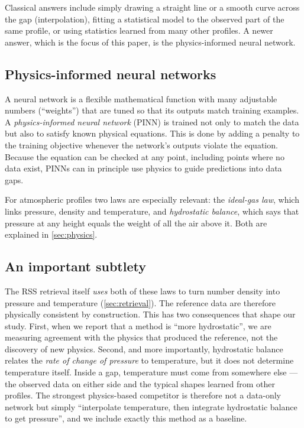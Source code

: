 \documentclass[11pt,a4paper]{article}
\begin{document}
Classical answers include simply drawing a straight line or a smooth curve across the gap (interpolation), fitting a statistical model to the observed part of the same profile, or using statistics learned from many other profiles. A newer answer, which is the focus of this paper, is the physics-informed neural network.

\subsection{Physics-informed neural networks}
A neural network is a flexible mathematical function with many adjustable numbers (``weights'') that are tuned so that its outputs match training examples. A \emph{physics-informed neural network} (PINN) \citep{raissi2019,karniadakis2021} is trained not only to match the data but also to satisfy known physical equations. This is done by adding a penalty to the training objective whenever the network's outputs violate the equation. Because the equation can be checked at any point, including points where no data exist, PINNs can in principle use physics to guide predictions into data gaps.

For atmospheric profiles two laws are especially relevant: the \emph{ideal-gas law}, which links pressure, density and temperature, and \emph{hydrostatic balance}, which says that pressure at any height equals the weight of all the air above it. Both are explained in \cref{sec:physics}.

\subsection{An important subtlety}
The RSS retrieval itself \emph{uses} both of these laws to turn number density into pressure and temperature (\cref{sec:retrieval}). The reference data are therefore physically consistent by construction. This has two consequences that shape our study. First, when we report that a method is ``more hydrostatic'', we are measuring agreement with the physics that produced the reference, not the discovery of new physics. Second, and more importantly, hydrostatic balance relates the \emph{rate of change of pressure} to temperature, but it does not determine temperature itself. Inside a gap, temperature must come from somewhere else --- the observed data on either side and the typical shapes learned from other profiles. The strongest physics-based competitor is therefore not a data-only network but simply ``interpolate temperature, then integrate hydrostatic balance to get pressure'', and we include exactly this method as a baseline.
\end{document}
